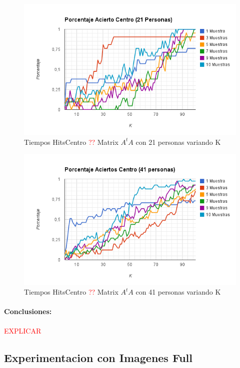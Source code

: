 \begin{figure}[H]
\includegraphics[width=1\textwidth]{img/imagen.png}
     \caption{Tiempos HitsCentro \textcolor{red}{??} Matrix $A^tA$ con 21 personas variando K}
     \label{fig:figura1}
\end{figure}

\begin{figure}[H]
\includegraphics[width=1\textwidth]{img/imager.png}
     \caption{Tiempos HitsCentro \textcolor{red}{??} Matrix $A^tA$ con 41 personas variando K}
     \label{fig:figura1}
\end{figure}

\paragraph{Conclusiones:}

\textcolor{red}{EXPLICAR}

\subsection{Experimentacion con Imagenes Full}

